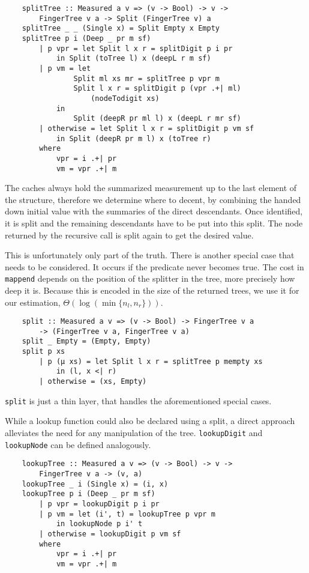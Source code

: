 \begin{verbatim}
    splitTree :: Measured a v => (v -> Bool) -> v ->
        FingerTree v a -> Split (FingerTree v) a
    splitTree _ _ (Single x) = Split Empty x Empty
    splitTree p i (Deep _ pr m sf)
        | p vpr = let Split l x r = splitDigit p i pr 
            in Split (toTree l) x (deepL r m sf)
        | p vm = let
                Split ml xs mr = splitTree p vpr m
                Split l x r = splitDigit p (vpr .+| ml)
                    (nodeTodigit xs)
            in
                Split (deepR pr ml l) x (deepL r mr sf)
        | otherwise = let Split l x r = splitDigit p vm sf
            in Split (deepR pr m l) x (toTree r)
        where
            vpr = i .+| pr
            vm = vpr .+| m
\end{verbatim}

The caches always hold the summarized measurement up to the last element of the structure, therefore we determine where to decent, by combining the handed down initial value with the summaries of the direct descendants. Once identified, it is split and the remaining descendants have to be put into this split. The node returned by the recursive call is split again to get the desired value.\par
This is unfortunately only part of the truth. There is another special case that needs to be considered. It occurs if the predicate never becomes true.
The cost in \texttt{mappend} depends on the position of the splitter in the tree,  more precisely how deep it is. Because this is encoded in the size of the returned trees, we use it for our estimation, \(\Theta(\log(\min\{n_l,n_r\}))\).

\begin{verbatim}
    split :: Measured a v => (v -> Bool) -> FingerTree v a
        -> (FingerTree v a, FingerTree v a)
    split _ Empty = (Empty, Empty)
    split p xs
        | p (μ xs) = let Split l x r = splitTree p mempty xs
            in (l, x <| r)
        | otherwise = (xs, Empty)
\end{verbatim}

\texttt{split} is just a thin layer, that handles the aforementioned special cases.\par
While a lookup function could also be declared using a split, a direct approach alleviates the need for any manipulation of the tree. \texttt{lookupDigit} and \texttt{lookupNode} can be defined analogously.

\begin{verbatim}
    lookupTree :: Measured a v => (v -> Bool) -> v ->
        FingerTree v a -> (v, a)
    lookupTree _ i (Single x) = (i, x)
    lookupTree p i (Deep _ pr m sf)
        | p vpr = lookupDigit p i pr
        | p vm = let (i', t) = lookupTree p vpr m
            in lookupNode p i' t
        | otherwise = lookupDigit p vm sf
        where
            vpr = i .+| pr
            vm = vpr .+| m
\end{verbatim}
